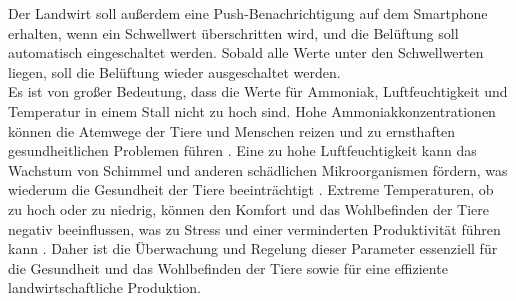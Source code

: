 \documentclass[conference]{IEEEtran}
\begin{document}
Der Landwirt soll außerdem eine Push-Benachrichtigung auf dem Smartphone erhalten, wenn ein Schwellwert überschritten wird, und die Belüftung soll automatisch eingeschaltet werden. Sobald alle Werte unter den Schwellwerten liegen, soll die Belüftung wieder ausgeschaltet werden. \\
Es ist von großer Bedeutung, dass die Werte für Ammoniak, Luftfeuchtigkeit und Temperatur in einem Stall nicht zu hoch sind. Hohe Ammoniakkonzentrationen können die Atemwege der Tiere und Menschen reizen und zu ernsthaften gesundheitlichen Problemen führen \cite{ammoniak}. Eine zu hohe Luftfeuchtigkeit kann das Wachstum von Schimmel und anderen schädlichen Mikroorganismen fördern, was wiederum die Gesundheit der Tiere beeinträchtigt \cite{luftfeuchtigkeit}. Extreme Temperaturen, ob zu hoch oder zu niedrig, können den Komfort und das Wohlbefinden der Tiere negativ beeinflussen, was zu Stress und einer verminderten Produktivität führen kann \cite{temperatur}. Daher ist die Überwachung und Regelung dieser Parameter essenziell für die Gesundheit und das Wohlbefinden der Tiere sowie für eine effiziente landwirtschaftliche Produktion. 
\end{document}
